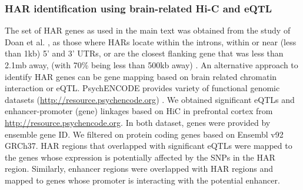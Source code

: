 \begin{refsection}
\subsubsection*{HAR identification using brain-related Hi-C and eQTL}
The set of HAR genes as used in the main text was obtained from the study of Doan et al. \citep{doan2016mutations}, as those where HARs locate within the introns, within or near (less than 1kb) 5' and 3' UTRs, or are the closest flanking gene that was less than 2.1mb away, (with 70\%  being less than 500kb away) \citep{doan2016mutations}. An alternative approach to identify HAR genes can be gene mapping based on brain related chromatin interaction or eQTL. PsychENCODE provides variety of functional genomic datasets (\url{http://resource.psychencode.org}) \citep{wang2018comprehensive}. We obtained significant eQTLs and enhancer-promoter (gene) linkages based on HiC in prefrontal cortex from \url{http://resource.psychencode.org}. In both dataset, genes were provided by ensemble gene ID. We filtered on protein coding genes based on Ensembl v92 GRCh37. HAR regions that overlapped with significant eQTLs were mapped to the genes whose expression is potentially affected by the SNPs in the HAR region. Similarly, enhancer regions were overlapped with HAR regions and mapped to genes whose promoter is interacting with the potential enhancer.


\end{refsection}
